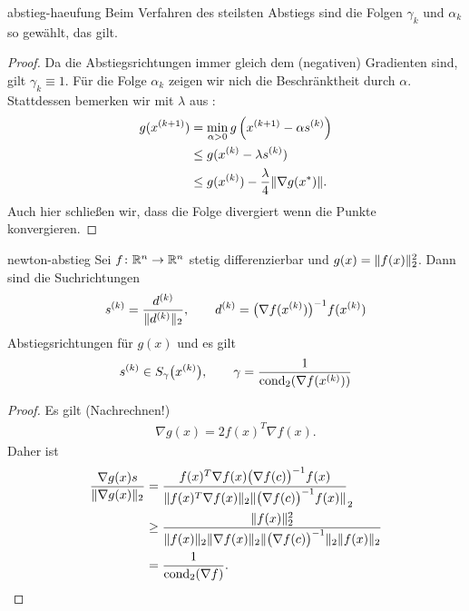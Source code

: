 \begin{Korollar}{abstieg-haeufung}
  Beim Verfahren des steilsten Abstiegs sind die Folgen $\gamma_k$ und
  $\alpha_k$ so gewählt, das  gilt.
\end{Korollar}

\begin{proof}
  Da die Abstiegsrichtungen immer gleich dem (negativen) Gradienten
  sind, gilt $\gamma_k \equiv 1$. Für die Folge $\alpha_k$ zeigen wir
  nich die Beschränktheit durch $\alpha$. Stattdessen bemerken wir mit
  $\lambda$ aus :
  \begin{align}
    g(x^{(k+1)})
    &= \min_{\alpha>0} g\left(x^{(k+1)}-\alpha s^{(k)}\right)\\
    &\le g(x^{(k)}-\lambda s^{(k)})\\
    &\le g(x^{(k)}) - \frac{\lambda}4 \lVert\nabla g(x^*)\rVert.
  \end{align}
  Auch hier schließen wir, dass die Folge divergiert wenn die Punkte konvergieren.
\end{proof}

\begin{Lemma}{newton-abstieg}
  Sei $f\colon \mathbb R^n\to \mathbb R^n$ stetig differenzierbar und
  $g(x) = \lVert f(x)\rVert_2^2$.  Dann sind die Suchrichtungen
  \begin{gather}
    s^{(k)} = \frac{d^{(k)}}{\lVert d^{(k)}\rVert_2},
    \qquad d^{(k)} = \bigl(\nabla f(x^{(k)})\bigr)^{-1}f(x^{(k)})
  \end{gather}
  Abstiegsrichtungen für $g(x)$ und es gilt
  \begin{gather}
    s^{(k)} \in S_\gamma\bigl(x^{(k)}\bigr),
    \qquad
    \gamma = \frac{1}{\operatorname{cond}_2(\nabla f(x^{(k)}))}
  \end{gather}
\end{Lemma}

\begin{proof}
  Es gilt (Nachrechnen!)
  \begin{gather}
    \nabla g(x) = 2 f(x)^T\nabla f(x).
  \end{gather}
  Daher ist
  \begin{align}
    \frac{\nabla g(x) s}{\lVert\nabla g(x)\rVert_2}
    &= \frac{f(x)^T \nabla f(x) \bigl(\nabla f(c)\bigr)^{-1} f(x)}
      {\lVert f(x)^T\nabla f(x)\rVert_2\lVert\bigl(\nabla f(c)\bigr)^{-1} f(x)\rVert}_2\\
    &\ge \frac{\lVert f(x)\rVert^2_2}{\lVert f(x)\rVert_2\lVert\nabla f(x)\rVert_2\lVert\bigl(\nabla f(c)\bigr)^{-1}\rVert_2\lVert f(x)\rVert_2}\\
    &= \frac1{\operatorname{cond}_2(\nabla f)}.
  \end{align}
\end{proof}

